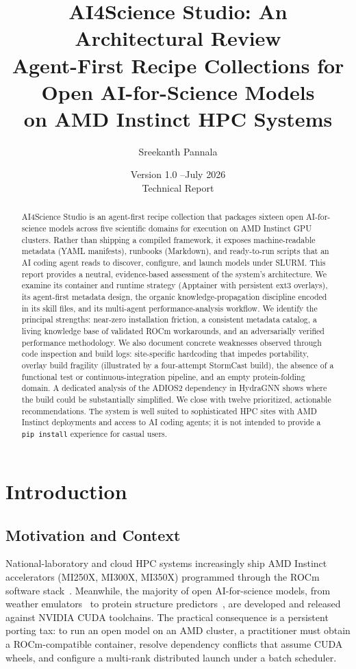 \documentclass[11pt]{article}
\title{\textbf{AI4Science Studio: An Architectural Review}\\[4pt]
  \large Agent-First Recipe Collections for Open AI-for-Science Models\\
  on AMD Instinct HPC Systems}
\author{Sreekanth Pannala}
\date{Version 1.0 \quad--\quad July 2026 \\[2pt] \small Technical Report}
\newcommand{\code}[1]{\texttt{#1}}
\begin{document}
\maketitle

\begin{abstract}
\noindent
AI4Science Studio is an agent-first recipe collection that packages sixteen open
AI-for-science models across five scientific domains for execution on AMD Instinct
GPU clusters. Rather than shipping a compiled framework, it exposes machine-readable
metadata (YAML manifests), runbooks (Markdown), and ready-to-run scripts that an AI
coding agent reads to discover, configure, and launch models under SLURM. This report
provides a neutral, evidence-based assessment of the system's architecture. We examine
its container and runtime strategy (Apptainer with persistent ext3 overlays), its
agent-first metadata design, the organic knowledge-propagation discipline encoded in
its skill files, and its multi-agent performance-analysis workflow. We identify the
principal strengths: near-zero installation friction, a consistent metadata catalog,
a living knowledge base of validated ROCm workarounds, and an adversarially verified
performance methodology. We also document concrete weaknesses observed through code
inspection and build logs: site-specific hardcoding that impedes portability, overlay
build fragility (illustrated by a four-attempt StormCast build), the absence of a
functional test or continuous-integration pipeline, and an empty protein-folding
domain. A dedicated analysis of the ADIOS2 dependency in HydraGNN shows where the
build could be substantially simplified. We close with twelve prioritized, actionable
recommendations. The system is well suited to sophisticated HPC sites with AMD Instinct
deployments and access to AI coding agents; it is not intended to provide a
\code{pip install} experience for casual users.
\end{abstract}

\tableofcontents
\clearpage

\section{Introduction}

\subsection{Motivation and Context}
National-laboratory and cloud HPC systems increasingly ship AMD Instinct
accelerators (MI250X, MI300X, MI350X) programmed through the ROCm software
stack~\cite{amd_rocm}. Meanwhile, the majority of open AI-for-science models,
from weather emulators~\cite{bi2023panguweather,price2025gencast} to protein
structure predictors~\cite{jumper2021alphafold2}, are developed and released
against NVIDIA CUDA toolchains. The practical consequence is a persistent
porting tax: to run an open model on an AMD cluster, a practitioner must obtain
a ROCm-compatible container, resolve dependency conflicts that assume CUDA
wheels, and configure a multi-rank distributed launch under a batch scheduler.
\end{document}
